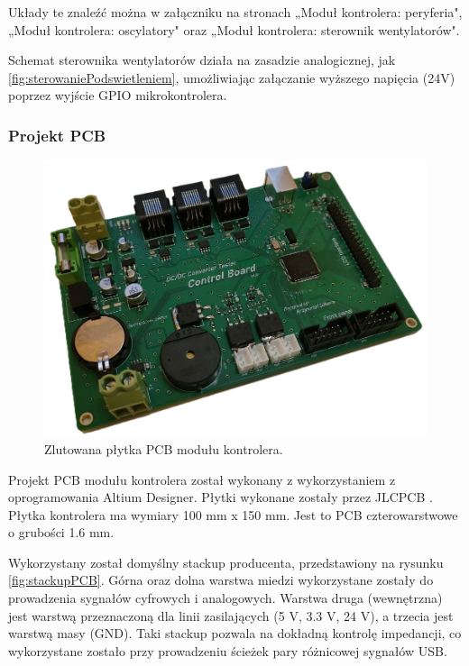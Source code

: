 Układy te znaleźć można w załączniku na stronach „Moduł kontrolera: peryferia", „Moduł kontrolera: oscylatory" oraz „Moduł kontrolera: sterownik wentylatorów".

Schemat sterownika wentylatorów działa na zasadzie analogicznej, jak \ref{fig:sterowaniePodswietleniem}, umożliwiając załączanie wyższego napięcia (24V) poprzez wyjście GPIO mikrokontrolera.


\subsubsection{Projekt PCB}
\label{section:controllerPCB}

\begin{figure}[h!]
    \begin{center}
        \includegraphics[width = 17cm]{images/controller_PCB.jpg}
        \caption{Zlutowana płytka PCB modułu kontrolera.} 
        \label{fig:modulkontroleraPCB}
    \end{center}
\end{figure}


Projekt PCB modułu kontrolera został wykonany z wykorzystaniem z oprogramowania Altium Designer.
Płytki wykonane zostały przez JLCPCB \cite{jlcpcb}. Płytka kontrolera ma wymiary 100 mm 
x 150 mm. Jest to PCB czterowarstwowe o grubości 1.6 mm. 

Wykorzystany został domyślny stackup producenta, przedstawiony na rysunku \ref{fig:stackupPCB}.
Górna oraz dolna warstwa miedzi wykorzystane zostały do prowadzenia sygnałów cyfrowych i analogowych. 
Warstwa druga (wewnętrzna) jest warstwą przeznaczoną dla linii zasilających (5 V, 3.3 V, 24 V), a trzecia 
jest warstwą masy (GND). Taki stackup pozwala na dokładną kontrolę impedancji, co wykorzystane zostało 
przy prowadzeniu ścieżek pary różnicowej sygnałów USB.


